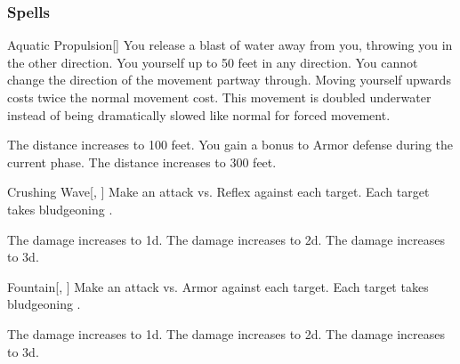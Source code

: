 \subsubsection{Spells}


\lowercase{\hypertarget{spell:Aquatic Propulsion}{}}\label{spell:Aquatic Propulsion}
\begin{freeability}[Rank 1]{\hypertarget{spell:Aquatic Propulsion}{Aquatic Propulsion}}[]
You release a blast of water away from you, throwing you in the other direction.
You  yourself up to 50 feet in any direction.
You cannot change the direction of the movement partway through.
Moving yourself upwards costs twice the normal movement cost.
This movement is doubled underwater instead of being dramatically slowed like normal for forced movement.

\rankline
{} The distance increases to 100 feet.
 You gain a  bonus to Armor defense during the current phase.
 The distance increases to 300 feet.
\end{freeability}
\vspace{0.25em}



\lowercase{\hypertarget{spell:Crushing Wave}{}}\label{spell:Crushing Wave}
\begin{freeability}[Rank 1]{\hypertarget{spell:Crushing Wave}{Crushing Wave}}[, ]
Make an attack vs. Reflex against each target.
\hit Each target takes bludgeoning .

\rankline
{} The damage increases to  \plus1d.
 The damage increases to  \plus2d.
 The damage increases to  \plus3d.
\end{freeability}
\vspace{0.25em}



\lowercase{\hypertarget{spell:Fountain}{}}\label{spell:Fountain}
\begin{freeability}[Rank 1]{\hypertarget{spell:Fountain}{Fountain}}[, ]
Make an attack vs. Armor against each target.
\hit Each target takes bludgeoning .

\rankline
{} The damage increases to  \plus1d.
 The damage increases to  \plus2d.
 The damage increases to  \plus3d.
\end{freeability}
\vspace{0.25em}



